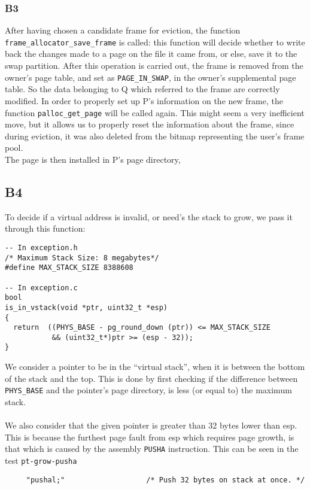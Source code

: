 \documentclass[a4wide, 11pt]{article}
\newcommand{\tx}{\texttt}
\begin{document}
\subsubsection{B3}
After having chosen a candidate frame for eviction, the function \tx{frame\_allocator\_save\_frame} is called: this function will decide whether to write back the changes made to a page on the file it came from, or else, save it to the swap partition. After this operation is carried out, the frame is removed from the owner's page table, and set as \tx{PAGE\_IN\_SWAP}, in the owner's supplemental page table. So the data belonging to Q which referred to the frame are correctly modified.
In order to properly set up P's information on the new frame, the function \tx{palloc\_get\_page} will be called again. This might seem a very inefficient move, but it allows us to properly reset the information about the frame, since during eviction, it was also deleted from the bitmap representing the user's frame pool.\\
The page is then installed in P's page directory,   


\subsection{B4}

To decide if a virtual address is invalid, or need's the stack to grow, we pass it through this function:
\begin{verbatim}
-- In exception.h
/* Maximum Stack Size: 8 megabytes*/
#define MAX_STACK_SIZE 8388608

-- In exception.c
bool
is_in_vstack(void *ptr, uint32_t *esp)
{
  return  ((PHYS_BASE - pg_round_down (ptr)) <= MAX_STACK_SIZE
           && (uint32_t*)ptr >= (esp - 32));
}
\end{verbatim}

We consider a pointer to be in the ``virtual stack'', when it is between the bottom of the stack and the top. This is done by first checking if the difference between \tx{PHYS\_BASE} and the pointer's page directory, is less (or equal to) the maximum stack.\\
\\
We also consider that the given pointer is greater than 32 bytes lower than esp. This is because the furthest page fault from esp which requires page growth, is that which is caused by the assembly \tx{PUSHA} instruction. This can be seen in the test \tx{pt-grow-pusha}

\begin{verbatim}
     "pushal;"                   /* Push 32 bytes on stack at once. */
\end{verbatim}
\end{document}
